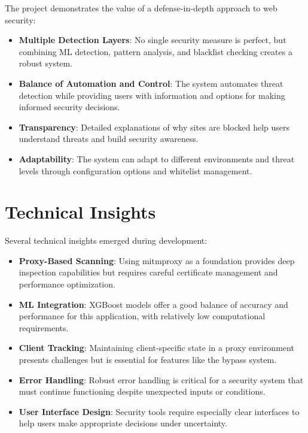 The project demonstrates the value of a defense-in-depth approach to web security:

\begin{itemize}
    \item \textbf{Multiple Detection Layers}: No single security measure is perfect, but combining ML detection, pattern analysis, and blacklist checking creates a robust system.
    
    \item \textbf{Balance of Automation and Control}: The system automates threat detection while providing users with information and options for making informed security decisions.
    
    \item \textbf{Transparency}: Detailed explanations of why sites are blocked help users understand threats and build security awareness.
    
    \item \textbf{Adaptability}: The system can adapt to different environments and threat levels through configuration options and whitelist management.
\end{itemize}

\section{Technical Insights}

Several technical insights emerged during development:

\begin{itemize}
    \item \textbf{Proxy-Based Scanning}: Using mitmproxy as a foundation provides deep inspection capabilities but requires careful certificate management and performance optimization.
    
    \item \textbf{ML Integration}: XGBoost models offer a good balance of accuracy and performance for this application, with relatively low computational requirements.
    
    \item \textbf{Client Tracking}: Maintaining client-specific state in a proxy environment presents challenges but is essential for features like the bypass system.
    
    \item \textbf{Error Handling}: Robust error handling is critical for a security system that must continue functioning despite unexpected inputs or conditions.
    
    \item \textbf{User Interface Design}: Security tools require especially clear interfaces to help users make appropriate decisions under uncertainty.
\end{itemize}

